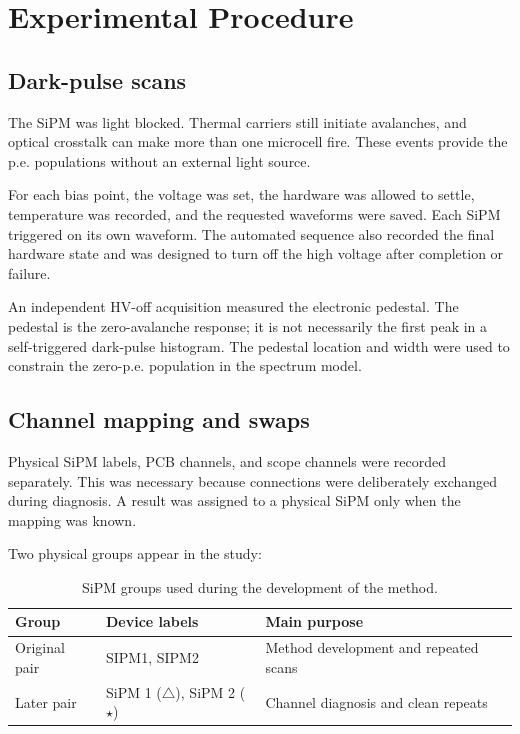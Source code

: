 \section{Experimental Procedure}

\subsection{Dark-pulse scans}

The SiPM was light blocked. Thermal carriers still initiate avalanches, and optical crosstalk can make more than one microcell fire. These events provide the p.e. populations without an external light source.

For each bias point, the voltage was set, the hardware was allowed to settle, temperature was recorded, and the requested waveforms were saved. Each SiPM triggered on its own waveform. The automated sequence also recorded the final hardware state and was designed to turn off the high voltage after completion or failure.

An independent HV-off acquisition measured the electronic pedestal. The pedestal is the zero-avalanche response; it is not necessarily the first peak in a self-triggered dark-pulse histogram. The pedestal location and width were used to constrain the zero-p.e. population in the spectrum model.

\subsection{Channel mapping and swaps}

Physical SiPM labels, PCB channels, and scope channels were recorded separately. This was necessary because connections were deliberately exchanged during diagnosis. A result was assigned to a physical SiPM only when the mapping was known.

Two physical groups appear in the study:

\begin{table}[htbp]
  \centering
  \caption{SiPM groups used during the development of the method.}
  \label{tab:device-groups}
  \begin{tabularx}{0.96\linewidth}{l l Y}
    \toprule
    Group & Device labels & Main purpose \\
    \midrule
    Original pair & SIPM1, SIPM2 & Method development and repeated scans \\
    Later pair & SiPM 1 ($\triangle$), SiPM 2 ($\star$) & Channel diagnosis and clean repeats \\
    \bottomrule
  \end{tabularx}
\end{table}

